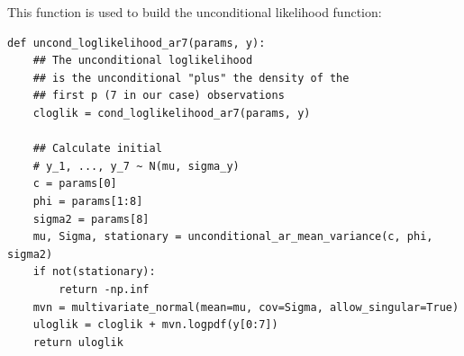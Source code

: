 \documentclass{article}
\begin{document}
This function is used to build the unconditional likelihood function:

\begin{verbatim}
def uncond_loglikelihood_ar7(params, y):
    ## The unconditional loglikelihood
    ## is the unconditional "plus" the density of the
    ## first p (7 in our case) observations
    cloglik = cond_loglikelihood_ar7(params, y)

    ## Calculate initial
    # y_1, ..., y_7 ~ N(mu, sigma_y)
    c = params[0] 
    phi = params[1:8]
    sigma2 = params[8]
    mu, Sigma, stationary = unconditional_ar_mean_variance(c, phi, sigma2)
    if not(stationary):
        return -np.inf
    mvn = multivariate_normal(mean=mu, cov=Sigma, allow_singular=True)
    uloglik = cloglik + mvn.logpdf(y[0:7])
    return uloglik
\end{verbatim}
\end{document}
